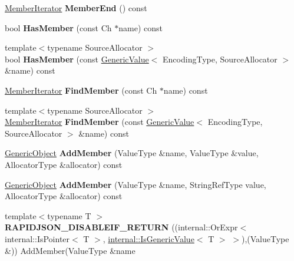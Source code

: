 \begin{DoxyCompactItemize}
\hyperlink{class_generic_member_iterator}{Member\+Iterator} {\bfseries Member\+End} () const
\item 
\mbox{\label{class_generic_object_a996d775e52cc7c5cf2aa308cf5a2b2cf}} 
bool {\bfseries Has\+Member} (const Ch $\ast$name) const
\item 
\mbox{\label{class_generic_object_a0b63666ca05c86f9d719350f2302a3f7}} 
{\footnotesize template$<$typename Source\+Allocator $>$ }\\bool {\bfseries Has\+Member} (const \hyperlink{class_generic_value}{Generic\+Value}$<$ Encoding\+Type, Source\+Allocator $>$ \&name) const
\item 
\mbox{\label{class_generic_object_a979890ccb3b116af19f9e3e77d3d286f}} 
\hyperlink{class_generic_member_iterator}{Member\+Iterator} {\bfseries Find\+Member} (const Ch $\ast$name) const
\item 
\mbox{\label{class_generic_object_a12a4fbbf2219d6bb43c3d61923830ab4}} 
{\footnotesize template$<$typename Source\+Allocator $>$ }\\\hyperlink{class_generic_member_iterator}{Member\+Iterator} {\bfseries Find\+Member} (const \hyperlink{class_generic_value}{Generic\+Value}$<$ Encoding\+Type, Source\+Allocator $>$ \&name) const
\item 
\mbox{\label{class_generic_object_a3668524c8566c46cbae97d938064f5fa}} 
\hyperlink{class_generic_object}{Generic\+Object} {\bfseries Add\+Member} (Value\+Type \&name, Value\+Type \&value, Allocator\+Type \&allocator) const
\item 
\mbox{\label{class_generic_object_ae871adc8c906a72878b7cf5df279ed1f}} 
\hyperlink{class_generic_object}{Generic\+Object} {\bfseries Add\+Member} (Value\+Type \&name, String\+Ref\+Type value, Allocator\+Type \&allocator) const
\item 
\mbox{\label{class_generic_object_a98ebcec632c41442d89cd8634b7ecc47}} 
{\footnotesize template$<$typename T $>$ }\\{\bfseries R\+A\+P\+I\+D\+J\+S\+O\+N\+\_\+\+D\+I\+S\+A\+B\+L\+E\+I\+F\+\_\+\+R\+E\+T\+U\+RN} ((internal\+::\+Or\+Expr$<$ internal\+::\+Is\+Pointer$<$ T $>$, \hyperlink{structinternal_1_1_is_generic_value}{internal\+::\+Is\+Generic\+Value}$<$ T $>$ $>$),(Value\+Type \&)) Add\+Member(Value\+Type \&name

\end{DoxyCompactItemize}
